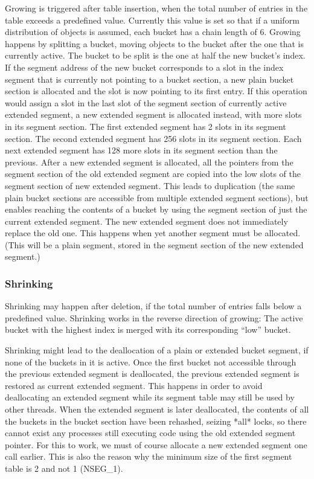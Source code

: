 \documentclass[aps,pre,preprint,nofootinbib]{revtex4}
\begin{document}
Growing is triggered after table insertion, when the total number of entries in the table exceeds a predefined value.
Currently this value is set so that if a uniform distribution of objects is assumed, each bucket has a chain length of 6.
Growing happens by splitting a bucket, moving objects to the bucket after the one that is currently active.
The bucket to be split is the one at half the new bucket's index.
If the segment address of the new bucket corresponds to a slot in the index segment that is currently not pointing to a bucket section, a new plain bucket section is allocated and the slot is now pointing to its first entry.
If this operation would assign a slot in the last slot of the segment section of currently active extended segment, a new extended segment is allocated instead, with more slots in its segment section.
The first extended segment has 2 slots in its segment section.
The second extended segment has 256 slots in its segment section.
Each next extended segment has 128 more slots in its segment section than the previous.
After a new extended segment is allocated, all the pointers from the segment section of the old extended segment are copied into the low slots of the segment section of new extended segment.
This leads to duplication (the same plain bucket sections are accessible from multiple extended segment sections), but enables reaching the contents of a bucket by using the segment section of just the current extended segment.
The new extended segment does not immediately replace the old one.
This happens when yet another segment must be allocated.
(This will be a plain segment, stored in the segment section of the new extended segment.)

\subsubsection{Shrinking}

Shrinking may happen after deletion, if the total number of entries falls below a predefined value.
Shrinking works in the reverse direction of growing:
The active bucket with the highest index is merged with its corresponding ``low'' bucket.

Shrinking might lead to the deallocation of a plain or extended bucket segment, if none of the buckets in it is active.
Once the first bucket not accessible through the previous extended segment is deallocated, the previous extended segment is restored as current extended segment.
This happens in order to avoid deallocating an extended segment while its segment table may still be used by other threads.
When the extended segment is later deallocated, the contents of all the buckets in the bucket section have been rehashed, seizing *all* locks, so there cannot exist any processes still executing code using the old extended segment pointer.
For this to work, we must of course allocate a new extended segment one call earlier.
This is also the reason why the minimum size of the first segment table is 2 and not 1 (NSEG\_1).
\end{document}

